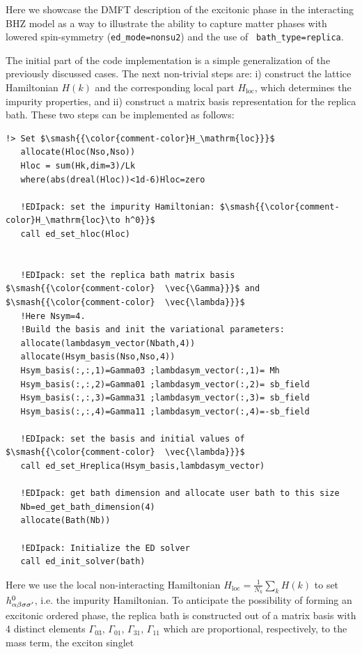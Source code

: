 \documentclass[edipack_sp.tex]{subfiles}
\begin{document}
Here we showcase the DMFT description of the excitonic phase in the interacting BHZ model as a way to
illustrate the \NAME ability to capture matter phases with lowered spin-symmetry ({\tt ed\_mode=nonsu2}) and the use of {\tt
  bath\_type=replica}.

The initial part of the code implementation is a simple generalization of the previously discussed cases. 
The next non-trivial steps are: i) construct the lattice Hamiltonian $H(k)$ and the corresponding local part $H_\mathrm{loc}$, which determines the impurity properties, and ii) construct a matrix basis representation for the replica bath. These two steps can be implemented as follows: 

\begin{lstlisting}[style=fstyle,numbers=none,basicstyle={\scriptsize\ttfamily}]
   !> Set $\smash{{\color{comment-color}H_\mathrm{loc}}}$ 
   allocate(Hloc(Nso,Nso))
   Hloc = sum(Hk,dim=3)/Lk
   where(abs(dreal(Hloc))<1d-6)Hloc=zero

   !EDIpack: set the impurity Hamiltonian: $\smash{{\color{comment-color}H_\mathrm{loc}\to h^0}}$
   call ed_set_hloc(Hloc)


   !EDIpack: set the replica bath matrix basis $\smash{{\color{comment-color}  \vec{\Gamma}}}$ and $\smash{{\color{comment-color}  \vec{\lambda}}}$
   !Here Nsym=4.
   !Build the basis and init the variational parameters:
   allocate(lambdasym_vector(Nbath,4))
   allocate(Hsym_basis(Nso,Nso,4))
   Hsym_basis(:,:,1)=Gamma03 ;lambdasym_vector(:,1)= Mh
   Hsym_basis(:,:,2)=Gamma01 ;lambdasym_vector(:,2)= sb_field
   Hsym_basis(:,:,3)=Gamma31 ;lambdasym_vector(:,3)= sb_field
   Hsym_basis(:,:,4)=Gamma11 ;lambdasym_vector(:,4)=-sb_field
   
   !EDIpack: set the basis and initial values of $\smash{{\color{comment-color}  \vec{\lambda}}}$
   call ed_set_Hreplica(Hsym_basis,lambdasym_vector)
   
   !EDIpack: get bath dimension and allocate user bath to this size
   Nb=ed_get_bath_dimension(4)
   allocate(Bath(Nb))
   
   !EDIpack: Initialize the ED solver
   call ed_init_solver(bath)
\end{lstlisting}
Here we use the local non-interacting Hamiltonian 
$H_\mathrm{loc}=\tfrac{1}{N_k}\sum_k H(k)$ to set 
$h^0_{\alpha\beta\sigma\sigma'}$, i.e. the impurity Hamiltonian. To anticipate the
possibility of forming an excitonic ordered phase, the replica bath
is constructed out of a matrix basis with 4 distinct elements
$\Gamma_{03}$, $\Gamma_{01}$, $\Gamma_{31}$, $\Gamma_{11}$ which are proportional, respectively, to the mass term, the exciton singlet
\end{document}
